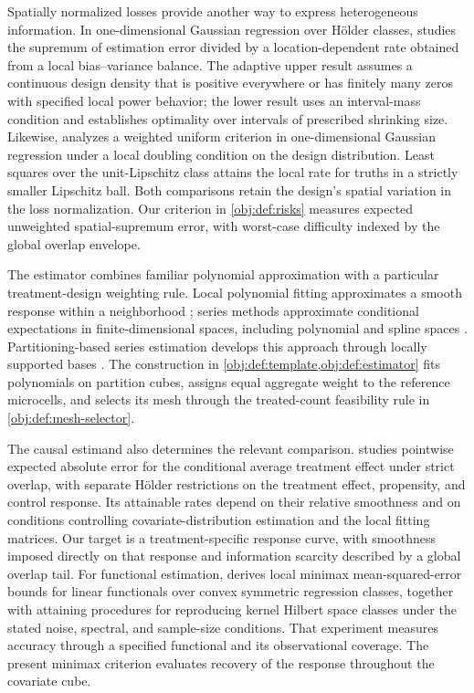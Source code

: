 \documentclass[11pt]{article}
\begin{document}
Spatially normalized losses provide another way to express heterogeneous information. In one-dimensional Gaussian regression over Hölder classes, \citet[Assumption D, equation (2.1), and Theorems 1--2]{gaiffas2009} studies the supremum of estimation error divided by a location-dependent rate obtained from a local bias--variance balance. The adaptive upper result assumes a continuous design density that is positive everywhere or has finitely many zeros with specified local power behavior; the lower result uses an interval-mass condition and establishes optimality over intervals of prescribed shrinking size. Likewise, \citet[Sections 1 and 3]{schmidthieber2024} analyzes a weighted uniform criterion in one-dimensional Gaussian regression under a local doubling condition on the design distribution. Least squares over the unit-Lipschitz class attains the local rate for truths in a strictly smaller Lipschitz ball. Both comparisons retain the design's spatial variation in the loss normalization. Our criterion in \cref{obj:def:risks} measures expected unweighted spatial-supremum error, with worst-case difficulty indexed by the global overlap envelope.

The estimator combines familiar polynomial approximation with a particular treatment-design weighting rule. Local polynomial fitting approximates a smooth response within a neighborhood \citep{fan1996}; series methods approximate conditional expectations in finite-dimensional spaces, including polynomial and spline spaces \citep{newey1997}. Partitioning-based series estimation develops this approach through locally supported bases \citep{CattaneoFarrellFeng2020}. The construction in \cref{obj:def:template,obj:def:estimator} fits polynomials on partition cubes, assigns equal aggregate weight to the reference microcells, and selects its mesh through the treated-count feasibility rule in \cref{obj:def:mesh-selector}.

The causal estimand also determines the relevant comparison. \citet[Theorems 1--2 and Remark 11]{KennedyBalakrishnanRobinsWasserman2024} studies pointwise expected absolute error for the conditional average treatment effect under strict overlap, with separate Hölder restrictions on the treatment effect, propensity, and control response. Its attainable rates depend on their relative smoothness and on conditions controlling covariate-distribution estimation and the local fitting matrices. Our target is a treatment-specific response curve, with smoothness imposed directly on that response and information scarcity described by a global overlap tail. For functional estimation, \citet[Theorems 1--3]{MouDingWainwrightBartlett2023} derives local minimax mean-squared-error bounds for linear functionals over convex symmetric regression classes, together with attaining procedures for reproducing kernel Hilbert space classes under the stated noise, spectral, and sample-size conditions. That experiment measures accuracy through a specified functional and its observational coverage. The present minimax criterion evaluates recovery of the response throughout the covariate cube.
\end{document}
